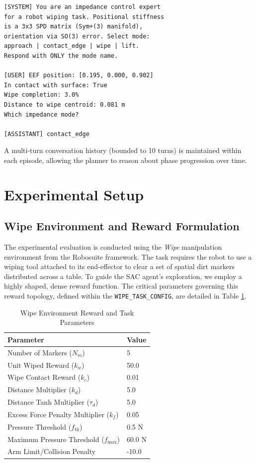 \documentclass[letterpaper, 10 pt, conference]{IEEEtran}
\begin{document}
\begin{verbatim}
[SYSTEM] You are an impedance control expert
for a robot wiping task. Positional stiffness
is a 3x3 SPD matrix (Sym+(3) manifold),
orientation via SO(3) error. Select mode:
approach | contact_edge | wipe | lift.
Respond with ONLY the mode name.

[USER] EEF position: [0.195, 0.000, 0.902]
In contact with surface: True
Wipe completion: 3.0%
Distance to wipe centroid: 0.081 m
Which impedance mode?

[ASSISTANT] contact_edge
\end{verbatim}

A multi-turn conversation history (bounded to 10 turns) is maintained within
each episode, allowing the planner to reason about phase progression over time.



\section{Experimental Setup}

\subsection{Wipe Environment and Reward Formulation}
\label{sec:wipe_reward_formulation}

The experimental evaluation is conducted using the \textit{Wipe} manipulation environment from the Robosuite \cite{zhu2020robosuite} framework. The task requires the robot to use a wiping tool attached to its end-effector to clear a set of spatial dirt markers distributed across a table. To guide the SAC agent's exploration, we employ a highly shaped, dense reward function. The critical parameters governing this reward topology, defined within the \texttt{WIPE\_TASK\_CONFIG}, are detailed in Table \ref{tab:reward_params}.

\begin{table}[h]
\centering
\caption{Wipe Environment Reward and Task Parameters}
\label{tab:reward_params}
\begin{tabular}{@{}ll@{}}
\toprule
\textbf{Parameter} & \textbf{Value} \\ \midrule
Number of Markers ($N_m$) & 5 \\
Unit Wiped Reward ($k_w$) & 50.0 \\
Wipe Contact Reward ($k_c$) & 0.01 \\
Distance Multiplier ($k_d$) & 5.0 \\
Distance Tanh Multiplier ($\tau_d$) & 5.0 \\
Excess Force Penalty Multiplier ($k_f$) & 0.05 \\
Pressure Threshold ($f_{\text{th}}$) & 0.5 N \\
Maximum Pressure Threshold ($f_{\text{max}}$) & 60.0 N \\
Arm Limit/Collision Penalty & -10.0 \\ \bottomrule
\end{tabular}
\end{table}
\end{document}
